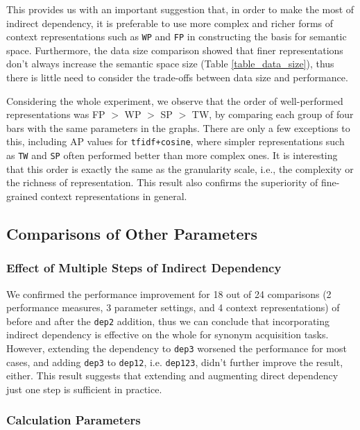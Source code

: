 \documentclass[english]{jnlp_1.4}
\begin{document}
This provides us with an important suggestion that, in order to make
the most of indirect dependency, it is preferable to use more complex
and richer forms of context representations such as \verb|WP| and
\verb|FP| in constructing the basis for semantic space. Furthermore,
the data size comparison showed that finer representations don't
always increase the semantic space size (Table \ref{table_data_size}),
thus there is little need to consider the trade-offs between data size
and performance.

Considering the whole experiment, we observe that the order of
well-performed representations was FP $>$ WP $>$ SP $>$ TW, by
comparing each group of four bars with the same parameters in the
graphs. There are only a few exceptions to this, including AP values
for \verb|tfidf+cosine|, where simpler representations such as
\verb|TW| and \verb|SP| often performed better than more complex
ones. It is interesting that this order is exactly the same as the
granularity scale, i.e., the complexity or the richness of
representation. This result also confirms the superiority of
fine-grained context representations in general.

\subsection{Comparisons of Other Parameters}

\subsubsection{Effect of Multiple Steps of Indirect Dependency}

We confirmed the performance improvement for 18 out of 24 comparisons
(2 performance measures, 3 parameter settings, and 4 context
representations) of before and after the \verb|dep2| addition, thus we
can conclude that incorporating indirect dependency is effective on
the whole for synonym acquisition tasks. However, extending the
dependency to \verb|dep3| worsened the performance for most cases, and
adding \verb|dep3| to \verb|dep12|, i.e. \verb|dep123|, didn't further
improve the result, either. This result suggests that extending and
augmenting direct dependency just one step is sufficient in practice.

\subsubsection{Calculation Parameters}
\end{document}
